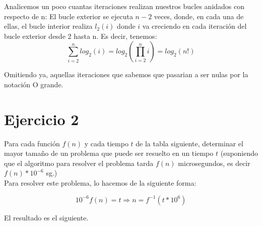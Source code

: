 \documentclass[11pt]{article}
\begin{document}
\begin{enumerate}
Analicemos un poco cuantas iteraciones realizan nuestros bucles anidados con respecto de n:
El bucle exterior se ejecuta $n-2$ veces,  donde, en cada una de ellas, el bucle interior realiza $l_2(i)$ donde $i$ va creciendo en cada iteración del bucle exterior desde 2 hasta n. Es decir, tenemos:
\[ \sum_{i=2}^{n} log_2  (i) = log_2 (\prod_{i=2}^{n}i) = log_2 (n!) \]

Omitiendo ya, aquellas iteraciones que sabemos que pasarian a ser nulas por la notación O grande.

	
\end{enumerate}


\section*{Ejercicio 2}

Para cada función $f(n)$ y cada tiempo $t$ de la tabla siguiente, determinar el mayor tamaño de un problema que puede ser resuelto en un tiempo $t$ (suponiendo que el algoritmo para resolver el problema tarda $f(n)$ microsegundos, es decir $f(n)*10^{-6}$ sg.)\\

Para resolver este problema, lo hacemos de la siguiente forma:

\[
10^{-6}f(n) = t \Rightarrow n = f^{-1}(t*10^6)
\]

El resultado es el siguiente.
\end{document}
